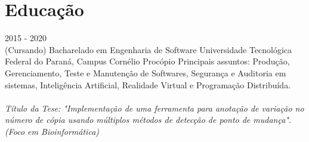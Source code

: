 \documentclass[]{friggeri-cv}
\begin{document}
\newpage

\section{Educação}
\begin{entrylist}
  \entry
    {2015 - 2020 \\(Cursando)}
    {Bacharelado em Engenharia de Software}
    {Universidade Tecnológica Federal do Paraná, Campus Cornélio Procópio}
    {Principais assuntos: Produção, Gerenciamento, Teste e Manutenção de Softwares, Segurança e Auditoria em sistemas, Inteligência Artificial, Realidade Virtual e Programação Distribuída.\\\\
    \emph{Título da Tese: "Implementação de uma ferramenta para anotação de variação no número de cópia usando múltiplos métodos de detecção de ponto de mudança". (Foco em Bioinformática)}\\}
\end{entrylist}
\end{document}
